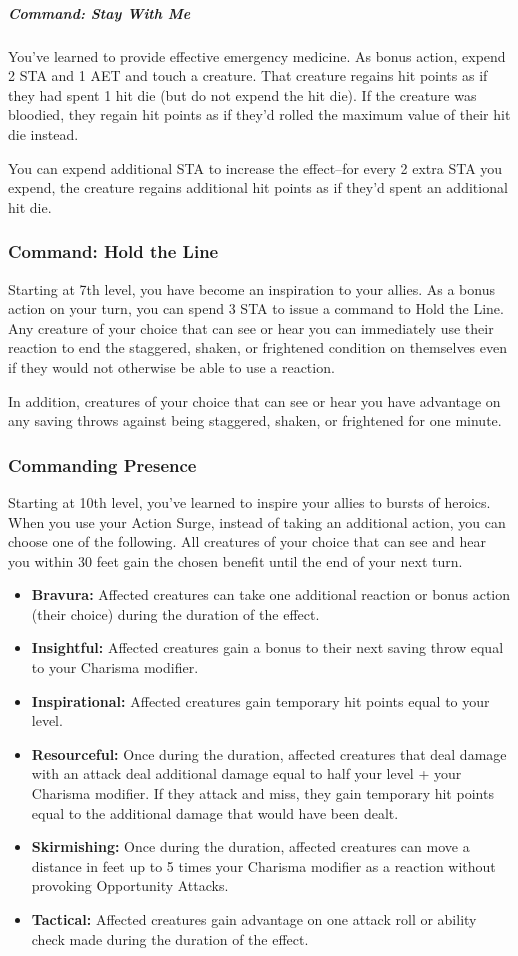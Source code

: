\subparagraph{Command: Stay With Me}
You've learned to provide effective emergency medicine. As bonus action, expend 2 STA and 1 AET and touch a creature. That creature regains hit points as if they had spent 1 hit die (but do not expend the hit die). If the creature was bloodied, they regain hit points as if they'd rolled the maximum value of their hit die instead.

You can expend additional STA to increase the effect--for every 2 extra STA you expend, the creature regains additional hit points as if they'd spent an additional hit die.

\subsubsection{Command: Hold the Line}
Starting at 7th level, you have become an inspiration to your allies. As a bonus action on your turn, you can spend 3 STA to issue a command to Hold the Line. Any creature of your choice that can see or hear you can immediately use their reaction to end the staggered, shaken, or frightened condition on themselves even if they would not otherwise be able to use a reaction.

In addition, creatures of your choice that can see or hear you have advantage on any saving throws against being staggered, shaken, or frightened for one minute.

\subsubsection{Commanding Presence}
Starting at 10th level, you've learned to inspire your allies to bursts of heroics. When you use your Action Surge, instead of taking an additional action, you can choose one of the following. All creatures of your choice that can see and hear you within 30 feet gain the chosen benefit until the end of your next turn.
\begin{itemize}
	\item \textbf{Bravura:} Affected creatures can take one additional reaction or bonus action (their choice) during the duration of the effect.
	\item \textbf{Insightful:} Affected creatures gain a bonus to their next saving throw equal to your Charisma modifier.
	\item \textbf{Inspirational:} Affected creatures gain temporary hit points equal to your level.
	\item \textbf{Resourceful:} Once during the duration, affected creatures that deal damage with an attack deal additional damage equal to half your level + your Charisma modifier. If they attack and miss, they gain temporary hit points equal to the additional damage that would have been dealt.
	\item \textbf{Skirmishing:} Once during the duration, affected creatures can move a distance in feet up to 5 times your Charisma modifier as a reaction without provoking Opportunity Attacks.
	\item \textbf{Tactical:} Affected creatures gain advantage on one attack roll or ability check made during the duration of the effect.
\end{itemize}


